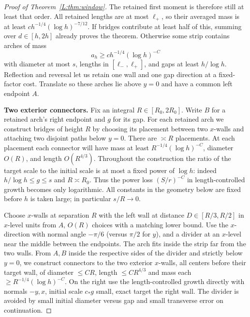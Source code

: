 \documentclass[11pt]{article}
\numberwithin{equation}{section}
\theoremstyle{definition}\newtheorem{definition}[theorem]{Definition}
\theoremstyle{remark}\newtheorem{remark}[theorem]{Remark}
\begin{document}
\begin{proof}[Proof of Theorem~\ref{L:thm:window}]
The retained first moment is therefore still at least that order.
All retained lengths are at most $\ell_+$, so their averaged mass is
at least $ch^{-1/4}(\log h)^{-7/12}$.  If bridges contribute at least
half of this, summing over $d\in[h,2h]$ already proves the theorem.
Otherwise some strip contains arches of mass
\[
 a_h\ge c h^{-1/4}(\log h)^{-C}
\]
with diameter at most $s$, lengths in $[\ell_-,\ell_+]$, and gaps
at least $h/\log h$.  Reflection and reversal let us retain one
wall and one gap direction at a fixed-factor cost.  Translate so
these arches lie above $y=0$ and have a common left endpoint $A$.

\medskip\noindent\textbf{Two exterior connectors.}
Fix an integral $R\in[R_0,2R_0]$.  Write $B$ for a retained arch's
right endpoint and $g$ for its gap.  For each retained arch we construct
bridges of height $R$ by choosing its placement between two $x$-walls
and attaching two disjoint paths below $y=0$.  There are $\asymp R$
placements.  At each placement each connector will have mass at least
$R^{-1/4}(\log h)^{-C}$, diameter $O(R)$, and length $O(R^{4/3})$.
Throughout the construction the ratio of the target scale to the
initial scale is at most a fixed power of $\log h$: indeed
$h/\log h\le g\le s$ and $R\asymp R_0$.  Thus the power loss
$(S/r)^{-C}$ in length-controlled growth becomes only logarithmic.
All constants in the geometry below are fixed before $h$ is taken
large; in particular $s/R\to0$.

Choose \(x\)-walls at separation \(R\) with the left wall at distance \(D\in[R/3,R/2]\) in \(x\)-level units from \(A\), \(O(R)\) choices with a matching lower bound. Use the \(x\)-direction with normal angle \(-\pi/6\) (versus \(\pi/2\) for \(y\)), and a divider at an \(x\)-level near the middle between the endpoints. The arch fits inside the strip far from the two walls. From \(A,B\) inside the respective sides of the divider and strictly below \(y=0\), we construct connectors to the two exterior \(x\)-walls, all centers before their target wall, of diameter \(\le C R\), length \(\le C R^{4/3}\) and mass each \(\ge R^{-1/4}(\log h)^{-C}\). On the right use the length-controlled growth directly with normals \(-y,x\), initial scale \(c_* g\) small, exact target the right wall. The divider is avoided by small initial diameter versus gap and small transverse error on continuation.


\end{proof}
\end{document}
